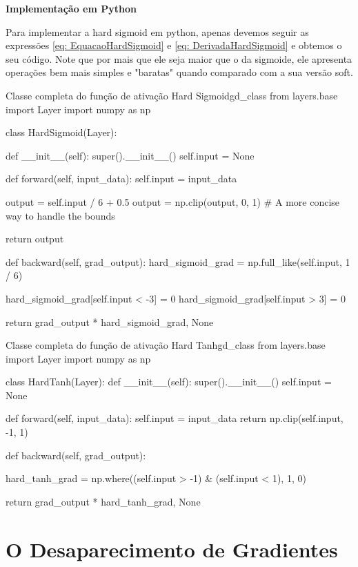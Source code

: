 \textbf{Implementação em Python}

Para implementar a hard sigmoid em python, apenas devemos seguir as expressões \ref{eq: EquacaoHardSigmoid} e \ref{eq: DerivadaHardSigmoid} e obtemos o seu código. Note que por mais que ele seja maior que o da sigmoide, ele apresenta operações bem mais simples e "baratas" quando comparado com a sua versão soft.

\begin{codelisting}{Classe completa do função de ativação Hard Sigmoid}{gd_class}
from layers.base import Layer
import numpy as np

class HardSigmoid(Layer):

    def __init__(self):
        super().__init__()
        self.input = None

    def forward(self, input_data):
        self.input = input_data

        output = self.input / 6 + 0.5
        output = np.clip(output, 0, 1)  # A more concise way to handle the bounds

        return output

    def backward(self, grad_output):
        hard_sigmoid_grad = np.full_like(self.input, 1 / 6)

        hard_sigmoid_grad[self.input < -3] = 0
        hard_sigmoid_grad[self.input > 3] = 0

        return grad_output * hard_sigmoid_grad, None
\end{codelisting}

\begin{codelisting}{Classe completa do função de ativação Hard Tanh}{gd_class}
from layers.base import Layer
import numpy as np


class HardTanh(Layer):
    def __init__(self):
        super().__init__()
        self.input = None

    def forward(self, input_data):
        self.input = input_data
        return np.clip(self.input, -1, 1)

    def backward(self, grad_output):

        hard_tanh_grad = np.where((self.input > -1) & (self.input < 1), 1, 0)

        return grad_output * hard_tanh_grad, None
\end{codelisting}

\section{O Desaparecimento de Gradientes}

